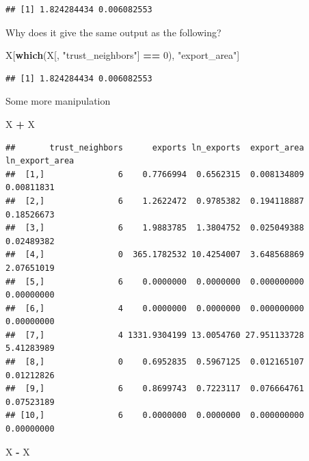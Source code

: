 \documentclass[
]{book}
\newenvironment{Shaded}{\begin{snugshade}}{\end{snugshade}}
\newcommand{\DecValTok}[1]{\textcolor[rgb]{0.00,0.00,0.81}{#1}}
\newcommand{\KeywordTok}[1]{\textcolor[rgb]{0.13,0.29,0.53}{\textbf{#1}}}
\newcommand{\NormalTok}[1]{#1}
\newcommand{\OperatorTok}[1]{\textcolor[rgb]{0.81,0.36,0.00}{\textbf{#1}}}
\newcommand{\StringTok}[1]{\textcolor[rgb]{0.31,0.60,0.02}{#1}}
\theoremstyle{definition}
\theoremstyle{definition}
\theoremstyle{definition}
\theoremstyle{remark}
\begin{document}
\begin{verbatim}
## [1] 1.824284434 0.006082553
\end{verbatim}

Why does it give the same output as the following?

\begin{Shaded}
\begin{Highlighting}[]
\NormalTok{X[}\KeywordTok{which}\NormalTok{(X[, }\StringTok{"trust\_neighbors"}\NormalTok{] }\OperatorTok{==}\StringTok{ }\DecValTok{0}\NormalTok{), }\StringTok{"export\_area"}\NormalTok{]}
\end{Highlighting}
\end{Shaded}

\begin{verbatim}
## [1] 1.824284434 0.006082553
\end{verbatim}

Some more manipulation

\begin{Shaded}
\begin{Highlighting}[]
\NormalTok{X }\OperatorTok{+}\StringTok{ }\NormalTok{X}
\end{Highlighting}
\end{Shaded}

\begin{verbatim}
##       trust_neighbors      exports ln_exports  export_area ln_export_area
##  [1,]               6    0.7766994  0.6562315  0.008134809     0.00811831
##  [2,]               6    1.2622472  0.9785382  0.194118887     0.18526673
##  [3,]               6    1.9883785  1.3804752  0.025049388     0.02489382
##  [4,]               0  365.1782532 10.4254007  3.648568869     2.07651019
##  [5,]               6    0.0000000  0.0000000  0.000000000     0.00000000
##  [6,]               4    0.0000000  0.0000000  0.000000000     0.00000000
##  [7,]               4 1331.9304199 13.0054760 27.951133728     5.41283989
##  [8,]               0    0.6952835  0.5967125  0.012165107     0.01212826
##  [9,]               6    0.8699743  0.7223117  0.076664761     0.07523189
## [10,]               6    0.0000000  0.0000000  0.000000000     0.00000000
\end{verbatim}

\begin{Shaded}
\begin{Highlighting}[]
\NormalTok{X }\OperatorTok{{-}}\StringTok{ }\NormalTok{X}
\end{Highlighting}
\end{Shaded}
\end{document}
